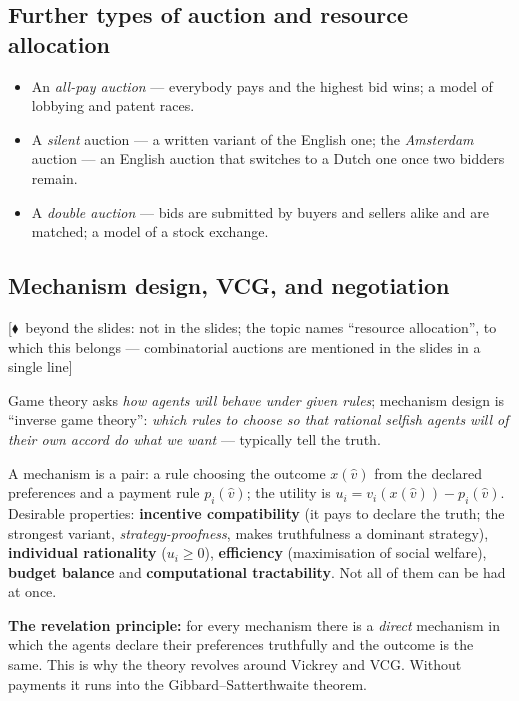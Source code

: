 \documentclass[11pt,a4paper]{article}
\theoremstyle{definition}
\providecommand{\uv}[1]{``#1''}
\newcommand{\mimoq}[1]{\textcolor{markcol}{\textsf{\footnotesize[$\blacklozenge$~beyond the slides: #1]}}}
\begin{document}
\subsection{Further types of auction and resource allocation}

\begin{itemize}
\item An \emph{all-pay auction} --- everybody pays and the highest bid wins; a model of lobbying
  and patent races.
\item A \emph{silent} auction --- a written variant of the English one; the \emph{Amsterdam}
  auction --- an English auction that switches to a Dutch one once two bidders remain.
\item A \emph{double auction} --- bids are submitted by buyers and sellers alike and are matched; a
  model of a stock exchange.
\end{itemize}

\subsection{Mechanism design, VCG, and negotiation}

\noindent\mimoq{not in the slides; the topic names \uv{resource allocation}, to which this
belongs --- combinatorial auctions are mentioned in the slides in a single line}

\begin{defbox}
Game theory asks \emph{how agents will behave under given rules}; mechanism design is
\uv{inverse game theory}: \emph{which rules to choose so that rational selfish agents will of
their own accord do what we want} --- typically tell the truth.

A mechanism is a pair: a rule choosing the outcome $x(\hat v)$ from the declared preferences and
a payment rule $p_i(\hat v)$; the utility is $u_i = v_i(x(\hat v)) - p_i(\hat v)$.
Desirable properties: \textbf{incentive compatibility} (it pays to declare the truth; the
strongest variant, \emph{strategy-proofness}, makes truthfulness a dominant strategy),
\textbf{individual rationality} ($u_i \ge 0$), \textbf{efficiency} (maximisation of social
welfare), \textbf{budget balance} and \textbf{computational tractability}. Not all of them can
be had at once.

\textbf{The revelation principle:} for every mechanism there is a \emph{direct} mechanism in
which the agents declare their preferences truthfully and the outcome is the same. This is why
the theory revolves around Vickrey and VCG. Without payments it runs into the
Gibbard--Satterthwaite theorem.
\end{defbox}
\end{document}
